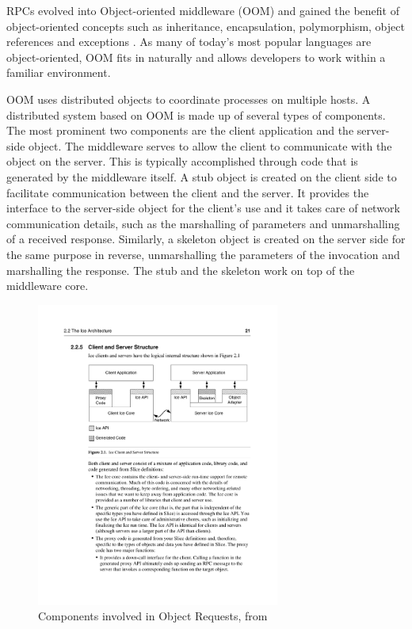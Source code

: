 \documentclass{acm_proc_article-sp}
\begin{document}
RPCs evolved into Object-oriented middleware (OOM) and gained the benefit of object-oriented concepts such as inheritance, encapsulation, polymorphism, object references and exceptions \cite{Pinus:2006p8367} \cite{Vinoski:2004p8371}.  As many of today's most popular languages are object-oriented, OOM fits in naturally and allows developers to work within a familiar environment.

OOM uses distributed objects to coordinate processes on multiple hosts.  A distributed system based on OOM is made up of several types of components.  The most prominent two components are the client application and the server-side object.  The middleware serves to allow the client to communicate with the object on the server.  This is typically accomplished through code that is generated by the middleware itself.  A stub object is created on the client side to facilitate communication between the client and the server.  It provides the interface to the server-side object for the client's use and it takes care of network communication details, such as the marshalling of parameters and unmarshalling of a received response.  Similarly, a skeleton object is created on the server side for the same purpose in reverse, unmarshalling the parameters of the invocation and marshalling the response.  The stub and the skeleton work on top of the middleware core.

\begin{figure}
\centering
\includegraphics[width=8cm]{icefig21.pdf}
\caption{Components involved in Object Requests, from \cite{icemanual}}
\label{fig:icefig21}
\end{figure}
\end{document}
